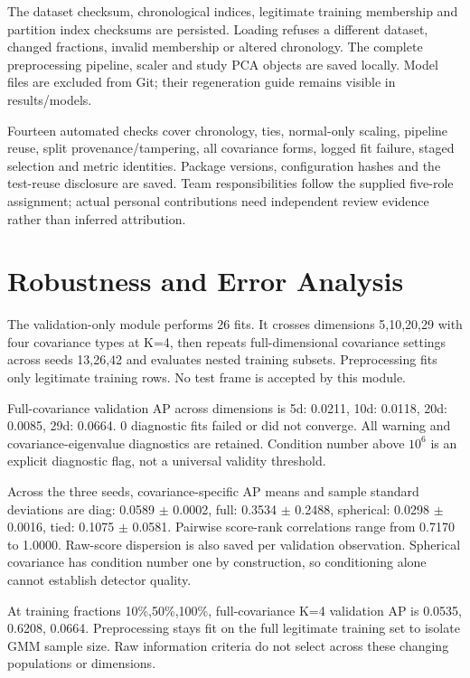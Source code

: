 \documentclass[conference]{IEEEtran}
\begin{document}
The dataset checksum, chronological indices, legitimate training membership and partition index checksums are persisted. Loading refuses a different dataset, changed fractions, invalid membership or altered chronology. The complete preprocessing pipeline, scaler and study PCA objects are saved locally. Model files are excluded from Git; their regeneration guide remains visible in results/models.

Fourteen automated checks cover chronology, ties, normal-only scaling, pipeline reuse, split provenance/tampering, all covariance forms, logged fit failure, staged selection and metric identities. Package versions, configuration hashes and the test-reuse disclosure are saved. Team responsibilities follow the supplied five-role assignment; actual personal contributions need independent review evidence rather than inferred attribution.


\section{Robustness and Error Analysis}
The validation-only module performs 26 fits. It crosses dimensions 5,10,20,29 with four covariance types at K=4, then repeats full-dimensional covariance settings across seeds 13,26,42 and evaluates nested training subsets. Preprocessing fits only legitimate training rows. No test frame is accepted by this module.

Full-covariance validation AP across dimensions is 5d: 0.0211, 10d: 0.0118, 20d: 0.0085, 29d: 0.0664. 0 diagnostic fits failed or did not converge. All warning and covariance-eigenvalue diagnostics are retained. Condition number above $10^6$ is an explicit diagnostic flag, not a universal validity threshold.

Across the three seeds, covariance-specific AP means and sample standard deviations are diag: 0.0589 $\pm$ 0.0002, full: 0.3534 $\pm$ 0.2488, spherical: 0.0298 $\pm$ 0.0016, tied: 0.1075 $\pm$ 0.0581. Pairwise score-rank correlations range from 0.7170 to 1.0000. Raw-score dispersion is also saved per validation observation. Spherical covariance has condition number one by construction, so conditioning alone cannot establish detector quality.

At training fractions 10\%,50\%,100\%, full-covariance K=4 validation AP is 0.0535, 0.6208, 0.0664. Preprocessing stays fit on the full legitimate training set to isolate GMM sample size. Raw information criteria do not select across these changing populations or dimensions.
\end{document}
